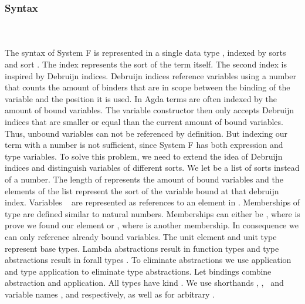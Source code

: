 \subsubsection{Syntax}\hfill\\\\
The syntax of System F is represented in a single data type , indexed by sorts  and sort . 
The index  represents the sort of the term itself.
The second index  is inspired by Debruijn indices. Debruijn indices reference variables using a number that counts the amount of binders that are in scope between the binding of the variable and the position it is used.
In Agda terms are often indexed by the amount of bound variables. The variable constructor then only accepts Debruijn indices that are smaller or equal than the current amount of bound variables. 
Thus, unbound variables can not be referenced by definition.
But indexing our term with a number is not sufficient, since System F has both expression and type variables. 
To solve this problem, we need to extend the idea of Debruijn indices and distinguish variables of different sorts. We let  be a list of sorts instead of a number.
The length of  represents the amount of bound variables and the elements  of the list represent the sort of the variable bound at that debruijn index. 
\FTerm
Variables \  are represented as references    to an element in .
Memberships of type    are defined similar to natural numbers. 
Memberships can either be , where  is prove we found our element or  , where  is another membership. 
In consequence we can only reference already bound variables.
The unit element  and unit type  represent base types. Lambda abstractions   result in function types    and type abstractions   result in forall types  . 
To eliminate abstractions we use application    and type application    to eliminate type abstractions. 
Let bindings     combine abstraction and application. All types  have kind .
We use shorthands \FVar, \FExpr, \FType\ and variable names ,  and  respectively, as well as  for arbitrary   .

